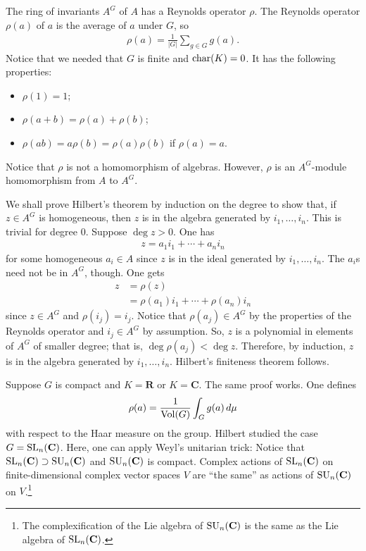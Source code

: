 \documentclass [11 pt, oneside] {article}
\begin{document}
The ring of invariants $A^G$ of $A$ has a Reynolds operator $\rho$. The Reynolds operator $\rho(a)$ of $a$ is the average of $a$ under $G$, so
\begin{align*}
	\rho(a) = \frac{1}{\left\lvert G \right\rvert } \sum_{g\in G}^{} g(a).
\end{align*}
Notice that we needed that $G$ is finite and $\operatorname{char}(K) = 0$. It has the following properties:
\begin{itemize}
	\item $\rho(1)=1$;
	\item $\rho(a+b) = \rho (a)+\rho (b)$;
	\item $\rho(ab) = a\rho (b)=\rho(a)\rho (b)$ if $\rho(a)=a$.
\end{itemize}
Notice that $\rho$ is not a homomorphism of algebras. However, $\rho$ is an $A^G$-module homomorphism from $A$ to $A^G$.

We shall prove Hilbert's theorem by induction on the degree to show that, if $z\in A^G$ is homogeneous, then $z$ is in the algebra generated by $i_1,\hdots,i_n$. This is trivial for degree $0$. Suppose $\deg z > 0$. One has
\begin{align*}
	z=a_1i_1 + \cdots +a_ni_n
\end{align*}
for some homogeneous $a_i\in A$ since $z$ is in the ideal generated by $i_1,\hdots, i_n$. The $a_i$s need not be in $A^G$, though. One gets
\begin{align*}
	z &= \rho(z)\\ 
	  &= \rho(a_1)i_1 + \cdots +\rho(a_n)i_n
\end{align*}
since $z\in A^G$ and $\rho(i_j)=i_j$. Notice that $\rho(a_j) \in A^G$ by the properties of the Reynolds operator and $i_j\in A^G$ by assumption. So, $z$ is a polynomial in elements of $A^G$ of smaller degree; that is, $\deg \rho(a_j)<\deg z$. Therefore, by induction, $z$ is in the algebra generated by $i_1,\hdots, i_n$. Hilbert's finiteness theorem follows.

Suppose $G$ is compact and $K=\mathbf{R}$ or $K=\mathbf{C}$. The same proof works. One defines 
\begin{align*}
	\rho(a) = \frac{1}{\operatorname{Vol} (G)}\int_{G}^{} g(a) \, d\mu
\end{align*}		
with respect to the Haar measure on the group. Hilbert studied the case $G=\operatorname{SL}_{n}(\mathbf{C})$. Here, one can apply Weyl's unitarian trick: Notice that $\operatorname{SL}_{n}(\mathbf{C})\supset \operatorname{SU}_n(\mathbf{C})$ and $\operatorname{SU}_n(\mathbf{C})$ is compact. Complex actions of $\operatorname{SL}_{n}(\mathbf{C})$ on finite-dimensional complex vector spaces $V$ are ``the same'' as actions of $\operatorname{SU}_n(\mathbf{C})$ on $V$.\footnote{The complexification of the Lie algebra of $\operatorname{SU}_n(\mathbf{C})$ is the same as the Lie algebra of $\operatorname{SL}_{n}(\mathbf{C})$.}
\end{document}

